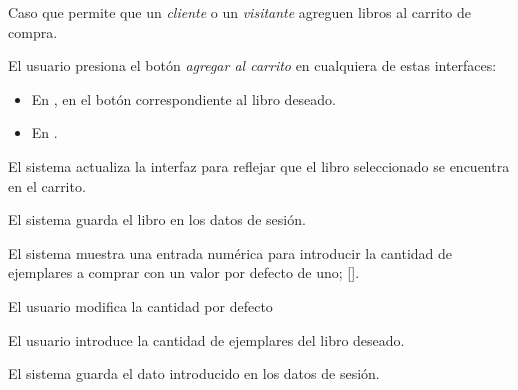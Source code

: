 %
%

{
  Caso que permite que un \textit{cliente} o un \textit{visitante} agreguen
  libros al carrito de compra.

  \begin{trayectoriaPrincipal}

    \item El usuario presiona el botón \textit{agregar al carrito} en
      cualquiera de estas interfaces:
      \begin{itemize}
        \item En , en el botón correspondiente
          al libro deseado.
        \item En .
      \end{itemize}

      \item El sistema actualiza la interfaz para reflejar que el libro
        seleccionado se encuentra en el carrito.

      \item El sistema guarda el libro en los datos de sesión.

      \item El sistema muestra una entrada numérica para introducir la cantidad
        de ejemplares a comprar con un valor por defecto de uno;
        [].

  \end{trayectoriaPrincipal}


  \begin{trayectoriaAlternativa}
    {El usuario modifica la cantidad por defecto}

    \item El usuario introduce la cantidad de ejemplares del libro deseado.

    \item El sistema guarda el dato introducido en los datos de sesión.

  \end{trayectoriaAlternativa}
}
